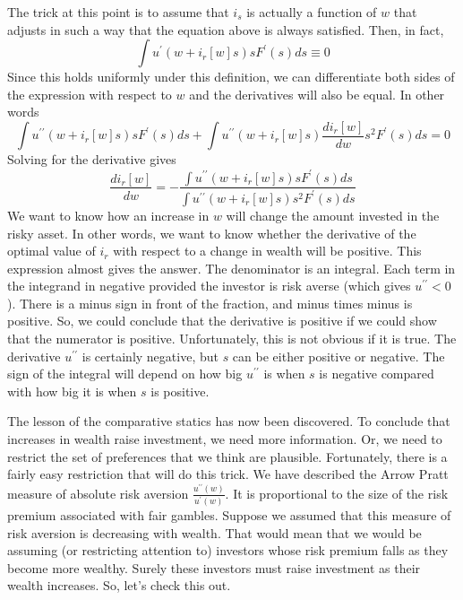 \documentclass[12pt]{article}
\begin{document}
The trick at this point is to assume that $i_{s}$ is actually a function of
$w$ that adjusts in such a way that the equation above is always satisfied.
Then, in fact,%
\[
\int u^{\prime}\left(  w+i_{r}\left[  w\right]  s\right)  sF^{\prime}\left(
s\right)  ds\equiv0
\]
Since this holds uniformly under this definition, we can differentiate both
sides of the expression with respect to $w$ and the derivatives will also be
equal. In other words%
\[
\int u^{\prime\prime}\left(  w+i_{r}\left[  w\right]  s\right)  sF^{\prime
}\left(  s\right)  ds+\int u^{\prime\prime}\left(  w+i_{r}\left[  w\right]
s\right)  \frac{di_{r}\left[  w\right]  }{dw}s^{2}F^{\prime}\left(  s\right)
ds=0
\]
Solving for the derivative gives%
\[
\frac{di_{r}\left[  w\right]  }{dw}=-\frac{\int u^{\prime\prime}\left(
w+i_{r}\left[  w\right]  s\right)  sF^{\prime}\left(  s\right)  ds}{\int
u^{\prime\prime}\left(  w+i_{r}\left[  w\right]  s\right)  s^{2}F^{\prime
}\left(  s\right)  ds}%
\]
We want to know how an increase in $w$ will change the amount invested in the
risky asset. In other words, we want to know whether the derivative of the
optimal value of $i_{r}$ with respect to a change in wealth will be positive.
This expression almost gives the answer. The denominator is an integral. Each
term in the integrand in negative provided the investor is risk averse (which
gives $u^{\prime\prime}<0$). There is a minus sign in front of the fraction,
and minus times minus is positive. So, we could conclude that the derivative is
positive if we could show that the numerator is positive. Unfortunately, this
is not obvious if it is true. The derivative $u^{\prime\prime}$ is certainly
negative, but $s$ can be either positive or negative. The sign of the integral
will depend on how big $u^{\prime\prime}$ is when $s$ is negative compared
with how big it is when $s$ is positive.

The lesson of the comparative statics has now been discovered. To conclude
that increases in wealth raise investment, we need more information. Or, we
need to restrict the set of preferences that we think are plausible.
Fortunately, there is a fairly easy restriction that will do this trick. We
have described the Arrow Pratt measure of absolute risk aversion
$\frac{u^{\prime\prime}\left(  w\right)  }{u^{\prime}\left(  w\right)  }$. It
is proportional to the size of the risk premium associated with fair gambles.
Suppose we assumed that this measure of risk aversion is decreasing with
wealth. That would mean that we would be assuming (or restricting attention
to) investors whose risk premium falls as they become more wealthy. Surely
these investors must raise investment as their wealth increases. So, let's check
this out.
\end{document}
